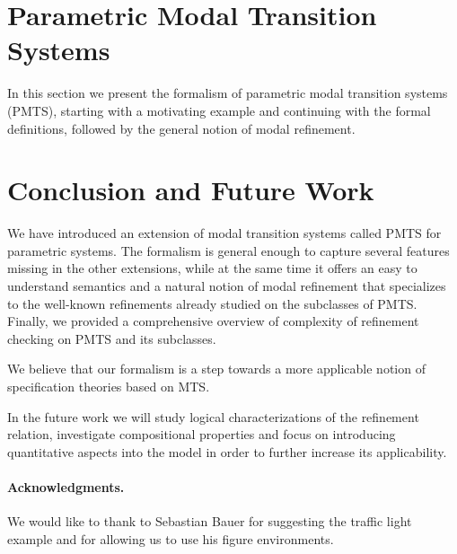 

\section{Parametric Modal Transition Systems} 
In this section we present the formalism of parametric modal
transition systems (PMTS), starting with a motivating example and continuing
with the formal definitions, followed by the general notion of
modal refinement. 







\section{Conclusion and Future Work} 

We have introduced an extension of modal transition systems
called PMTS for parametric systems. 
The formalism is general enough to capture several features missing in
the other extensions, while at the same time it offers an easy 
to understand semantics and a natural notion of modal refinement
that specializes to the well-known refinements 
already studied on the subclasses of PMTS. Finally, we provided a comprehensive
overview of complexity of refinement checking on PMTS and its subclasses.

We believe that our formalism is a step towards a more applicable 
notion of specification theories based on MTS.

In the future work
we will study logical characterizations of the refinement relation,
investigate compositional properties 
and focus on introducing quantitative aspects into the model in order
to further increase its applicability. 


\paragraph{Acknowledgments.} We would like to thank to
Sebastian Bauer for suggesting the traffic light example
and for allowing us to use his figure environments.
